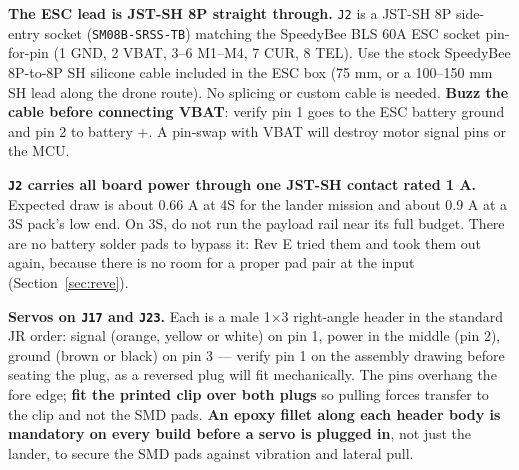 \documentclass[11pt,a4paper]{article}
\newcommand{\file}[1]{\texttt{\small #1}}
\newcommand{\flag}[1]{\textcolor{warnred}{\textbf{#1}}}
\begin{document}
\textbf{The ESC lead is JST-SH 8P straight through.} \file{J2} is a JST-SH 8P side-entry
socket (\file{SM08B-SRSS-TB}) matching the SpeedyBee BLS 60A ESC socket pin-for-pin (1 GND, 2 VBAT,
3--6 M1--M4, 7 CUR, 8 TEL). Use the stock SpeedyBee 8P-to-8P SH silicone cable included in the
ESC box (75 mm, or a 100--150 mm SH lead along the drone route). No splicing or custom cable
is needed. \flag{Buzz the cable before connecting VBAT}: verify pin 1 goes to the ESC battery
ground and pin 2 to battery $+$. A pin-swap with VBAT will destroy motor signal pins or the MCU.

\flag{\file{J2} carries all board power through one JST-SH contact rated 1 A.} Expected draw
is about 0.66 A at 4S for the lander mission and about 0.9 A at a 3S pack's low end. On 3S,
do not run the payload rail near its full budget. There are no battery solder pads to bypass
it: Rev E tried them and took them out again, because there is no room for a proper pad pair
at the input (Section~\ref{sec:reve}).

\textbf{Servos on \file{J17} and \file{J23}.} Each is a male 1$\times$3 right-angle header in the
standard JR order: signal (orange, yellow or white) on pin 1, power in the middle (pin 2),
ground (brown or black) on pin 3 --- verify pin 1 on the assembly drawing before seating the plug,
as a reversed plug will fit mechanically. The pins overhang the fore edge; \textbf{fit the printed
clip over both plugs} so pulling forces transfer to the clip and not the SMD pads.
\flag{An epoxy fillet along each header body is mandatory on every build before a servo is plugged in},
not just the lander, to secure the SMD pads against vibration and lateral pull.
\end{document}
